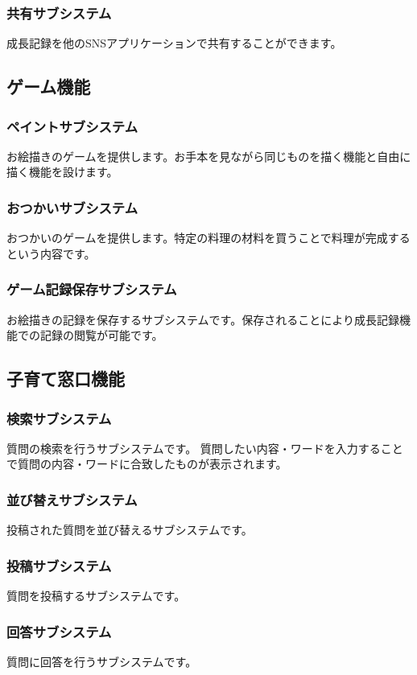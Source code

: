 \documentclass[a4j]{jarticle}
\begin{document}
\subsubsection*{共有サブシステム}
成長記録を他のSNSアプリケーションで共有することができます。

\subsection{ゲーム機能}
\subsubsection*{ペイントサブシステム}
お絵描きのゲームを提供します。お手本を見ながら同じものを描く機能と自由に描く機能を設けます。
\subsubsection*{おつかいサブシステム}
おつかいのゲームを提供します。特定の料理の材料を買うことで料理が完成するという内容です。
\subsubsection*{ゲーム記録保存サブシステム}
お絵描きの記録を保存するサブシステムです。保存されることにより成長記録機能での記録の閲覧が可能です。

\subsection{子育て窓口機能}
\subsubsection*{検索サブシステム}
質問の検索を行うサブシステムです。 質問したい内容・ワードを入力することで質問の内容・ワードに合致したものが表示されます。
\subsubsection*{並び替えサブシステム}
投稿された質問を並び替えるサブシステムです。
\subsubsection*{投稿サブシステム}
質問を投稿するサブシステムです。
\subsubsection*{回答サブシステム}
質問に回答を行うサブシステムです。
\end{document}
